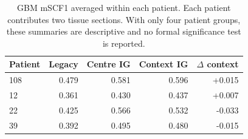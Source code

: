 \begin{table}[t]
\centering
\caption{GBM mSCF1 averaged within each patient. Each patient contributes two tissue sections. With only four patient groups, these summaries are descriptive and no formal significance test is reported.}
\label{tab:gbm_patient_summary}
\small
\begin{tabular}{@{}lrrrr@{}}
\toprule
Patient & Legacy & Centre IG & Context IG & $\Delta$ context \\
\midrule
108 & 0.479 & 0.581 & 0.596 & +0.015 \\
12 & 0.361 & 0.430 & 0.437 & +0.007 \\
22 & 0.425 & 0.566 & 0.532 & -0.033 \\
39 & 0.392 & 0.495 & 0.480 & -0.015 \\
\bottomrule
\end{tabular}
\end{table}
